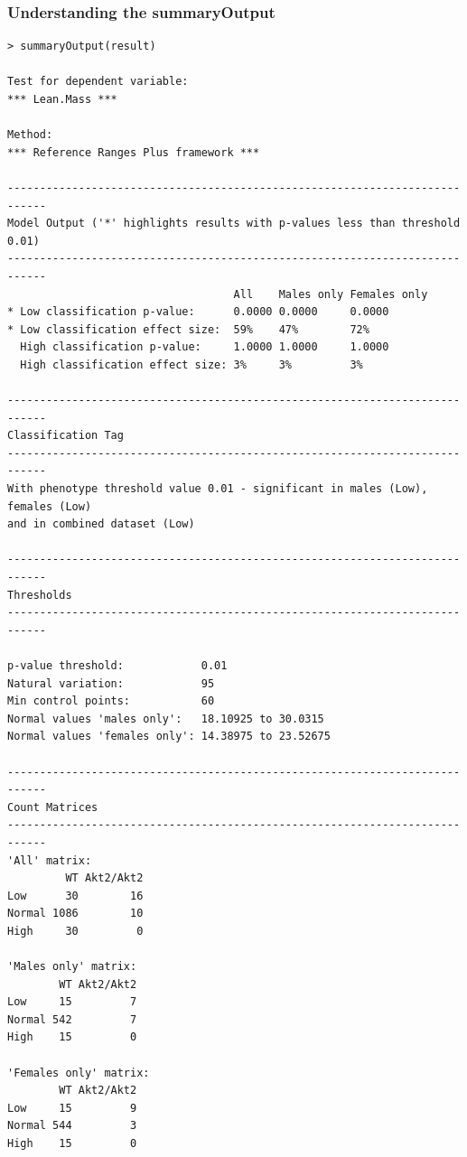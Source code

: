 \documentclass[12pt,a4paper]{article}
\begin{document}
\subsubsection{Understanding the summaryOutput}

\begingroup
    \fontsize{8pt}{12pt}\selectfont
\begin{verbatim}
> summaryOutput(result)

Test for dependent variable:
*** Lean.Mass ***

Method:
*** Reference Ranges Plus framework ***

----------------------------------------------------------------------------
Model Output ('*' highlights results with p-values less than threshold 0.01)
----------------------------------------------------------------------------
                                   All    Males only Females only
* Low classification p-value:      0.0000 0.0000     0.0000      
* Low classification effect size:  59%    47%        72%         
  High classification p-value:     1.0000 1.0000     1.0000      
  High classification effect size: 3%     3%         3%          

----------------------------------------------------------------------------
Classification Tag
----------------------------------------------------------------------------
With phenotype threshold value 0.01 - significant in males (Low), females (Low) 
and in combined dataset (Low)

----------------------------------------------------------------------------
Thresholds
----------------------------------------------------------------------------
                                                  
p-value threshold:            0.01                
Natural variation:            95                  
Min control points:           60                  
Normal values 'males only':   18.10925 to 30.0315 
Normal values 'females only': 14.38975 to 23.52675

----------------------------------------------------------------------------
Count Matrices
----------------------------------------------------------------------------
'All' matrix:
         WT Akt2/Akt2
Low      30        16
Normal 1086        10
High     30         0

'Males only' matrix:
        WT Akt2/Akt2
Low     15         7
Normal 542         7
High    15         0

'Females only' matrix:
        WT Akt2/Akt2
Low     15         9
Normal 544         3
High    15         0
\end{verbatim}
\endgroup 
\end{document}

